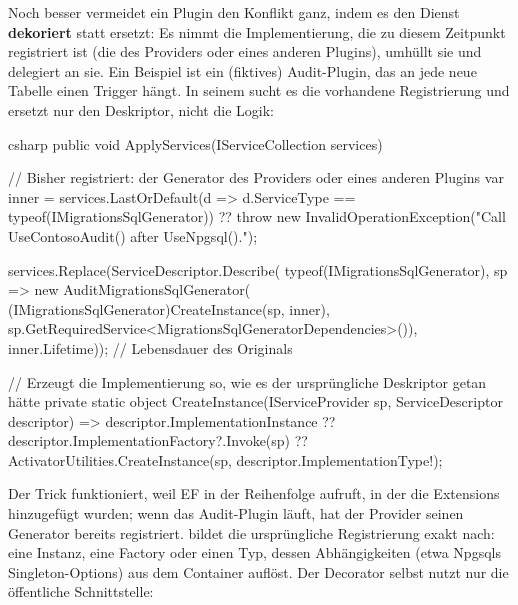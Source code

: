 Noch besser vermeidet ein Plugin den Konflikt ganz, indem es den Dienst \textbf{dekoriert}
statt ersetzt: Es nimmt die Implementierung, die zu diesem Zeitpunkt registriert ist (die
des Providers oder eines anderen Plugins), umhüllt sie und delegiert an sie. Ein Beispiel
ist ein (fiktives) Audit-Plugin, das an jede neue Tabelle einen Trigger hängt. In seinem
 sucht es die vorhandene Registrierung und ersetzt nur den
Deskriptor, nicht die Logik:

\begin{sourcecode}{csharp}
public void ApplyServices(IServiceCollection services)
{
    // Bisher registriert: der Generator des Providers oder eines anderen Plugins
    var inner = services.LastOrDefault(d => d.ServiceType == typeof(IMigrationsSqlGenerator))
        ?? throw new InvalidOperationException("Call UseContosoAudit() after UseNpgsql().");

    services.Replace(ServiceDescriptor.Describe(
        typeof(IMigrationsSqlGenerator),
        sp => new AuditMigrationsSqlGenerator(
            (IMigrationsSqlGenerator)CreateInstance(sp, inner),
            sp.GetRequiredService<MigrationsSqlGeneratorDependencies>()),
        inner.Lifetime));     // Lebensdauer des Originals
}

// Erzeugt die Implementierung so, wie es der ursprüngliche Deskriptor getan hätte
private static object CreateInstance(IServiceProvider sp, ServiceDescriptor descriptor)
    => descriptor.ImplementationInstance
       ?? descriptor.ImplementationFactory?.Invoke(sp)
       ?? ActivatorUtilities.CreateInstance(sp, descriptor.ImplementationType!);
\end{sourcecode}

Der Trick funktioniert, weil EF  in der Reihenfolge
aufruft, in der die Extensions hinzugefügt wurden; wenn das Audit-Plugin läuft, hat der
Provider seinen Generator bereits registriert.  bildet die
ursprüngliche Registrierung exakt nach: eine Instanz, eine Factory oder einen Typ, dessen
Abhängigkeiten (etwa Npgsqls Singleton-Options)  aus
dem Container auflöst. Der Decorator selbst nutzt nur die öffentliche Schnittstelle:

